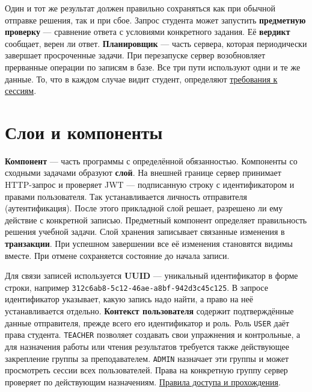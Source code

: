 \documentclass[12pt,a4paper]{article}
\begin{document}
Один и тот же результат должен правильно сохраняться как при обычной отправке решения, так и при сбое. Запрос студента может запустить \textbf{предметную проверку} --- сравнение ответа с условиями конкретного задания. Её \textbf{вердикт} сообщает, верен ли ответ. \textbf{Планировщик} --- часть сервера, которая периодически завершает просроченные задачи. При перезапуске сервер возобновляет прерванные операции по записям в базе. Все три пути используют одни и те же данные. То, что в каждом случае видит студент, определяют {\href{../04\_Системные\_требования/DOC-05\_Системные\_требования.pdf\#doc-05-требования-к-сессиям-задач}{требования к сессиям}}.

\section{Слои и компоненты}\label{2-ux441ux43bux43eux438-ux438-ux43aux43eux43cux43fux43eux43dux435ux43dux442ux44b}

\hypertarget{2-слои-и-компоненты}{}

\textbf{Компонент} --- часть программы с определённой обязанностью. Компоненты со сходными задачами образуют \textbf{слой}. На внешней границе сервер принимает HTTP-запрос и проверяет JWT --- подписанную строку с идентификатором и правами пользователя. Так устанавливается личность отправителя (аутентификация). После этого прикладной слой решает, разрешено ли ему действие с конкретной записью. Предметный компонент определяет правильность решения учебной задачи. Слой хранения записывает связанные изменения в \textbf{транзакции}. При успешном завершении все её изменения становятся видимы вместе. При отмене сохраняется состояние до начала записи.

Для связи записей используется \textbf{UUID} --- уникальный идентификатор в форме строки, например \texttt{312c6ab8-\allowbreak{}5c12-\allowbreak{}46ae-\allowbreak{}a8bf-\allowbreak{}942d3c45c125}. В запросе идентификатор указывает, какую запись надо найти, а право на неё устанавливается отдельно. \textbf{Контекст пользователя} содержит подтверждённые данные отправителя, прежде всего его идентификатор и роль. Роль \texttt{USER} даёт права студента. \texttt{TEACHER} позволяет создавать свои упражнения и контрольные, а для назначения работы или чтения результатов требуется также действующее закрепление группы за преподавателем. \texttt{ADMIN} назначает эти группы и может просмотреть сессии всех пользователей. Права на конкретную группу сервер проверяет по действующим назначениям. {\href{../02\_Техническое\_задание/DOC-02\_Техническое\_задание.pdf\#правила-доступа-и-прохождения-контрольного-мероприятия}{Правила доступа и прохождения}}.
\end{document}

